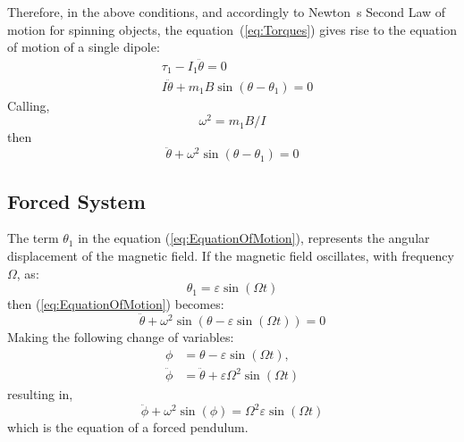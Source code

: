 Therefore, in the above conditions, and accordingly to Newton~\textquotesingle s Second Law of motion for spinning objects, the equation~(\ref{eq:Torques}) gives rise to the equation of motion of a single dipole:
\begin{equation}
    \begin{aligned}
        &\tau_1 - I_1 \ddot{\theta} = 0\\
        &I \ddot{\theta} + m_1 B \sin(\theta - \theta_1) = 0        
    \end{aligned}
\end{equation}
Calling,
\begin{equation}
    \omega^2 = m_1 B/I 
\end{equation} 
then
\begin{equation}
    \ddot{\theta} +\omega^2 \sin(\theta - \theta_1) = 0
    \label{eq:EquationOfMotion}
\end{equation}

\subsection{Forced System}
The term $\theta_1$ in the equation (\ref{eq:EquationOfMotion}), represents the angular displacement of the magnetic field. If the magnetic field oscillates, with frequency $\Omega$, as:
\begin{equation}
    \theta_1 = \varepsilon \sin(\Omega t)
\end{equation}
then (\ref{eq:EquationOfMotion}) becomes:
\begin{equation}
    \ddot{\theta} +\omega^2 \sin(\theta - \varepsilon \sin(\Omega t)) = 0
\end{equation}
Making the following change of variables:
\begin{equation}
    \begin{aligned}
        \phi &= \theta - \varepsilon \sin(\Omega t),\\
        \ddot{\phi} &= \ddot{\theta} + \varepsilon \Omega^2 \sin(\Omega t)
    \end{aligned}
\end{equation}
resulting in, 
\begin{equation}
    \ddot{\phi} + \omega^2 \sin(\phi) =\Omega^2 \varepsilon \sin(\Omega t)
\end{equation}
which is the equation of a forced pendulum. 
